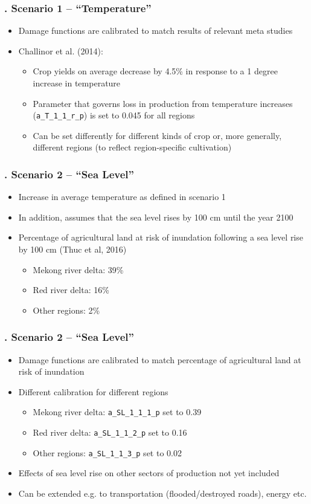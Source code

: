\documentclass[11pt,aspectratio=169]{beamer}
\begin{document}
\begin{frame}
\frametitle{{\thesection.\thesubsection} Scenario 1 -- "`Temperature"'}
\begin{itemize}
\item Damage functions are calibrated to match results of relevant meta studies
\item Challinor et al. (2014):
	\begin{itemize}
		\item Crop yields on average decrease by 4.5\% in response to a 1 degree increase in temperature
		\item Parameter that governs loss in production from temperature increases (\texttt{a\_T\_1\_1\_r\_p}) is set to 0.045 for all regions
		\item Can be set differently for different kinds of crop or, more generally, different regions (to reflect region-specific cultivation)
	\end{itemize}
\end{itemize}
\end{frame}

\begin{frame}
\frametitle{{\thesection.\thesubsection} Scenario 2 -- "`Sea Level"'}
\begin{itemize}
\item Increase in average temperature as defined in scenario 1
\item In addition, assumes that the sea level rises by 100 cm until the year 2100 
\item Percentage of agricultural land at risk of inundation following a sea level rise by 100 cm (Thuc et al, 2016)
	\begin{itemize}
		\item Mekong river delta: 39\%
		\item Red river delta: 16\%
		\item Other regions: 2\%
	\end{itemize}
\end{itemize}
\end{frame}

\begin{frame}
\frametitle{{\thesection.\thesubsection} Scenario 2 -- "`Sea Level"'}
\begin{itemize}
\item Damage functions are calibrated to match percentage of agricultural land at risk of inundation
\item Different calibration for different regions
	\begin{itemize}
		\item Mekong river delta: \texttt{a\_SL\_1\_1\_1\_p} set to 0.39
		\item Red river delta: \texttt{a\_SL\_1\_1\_2\_p} set to 0.16
		\item Other regions: \texttt{a\_SL\_1\_1\_3\_p} set to 0.02
	\end{itemize}
	\item Effects of sea level rise on other sectors of production not yet included
	\item Can be extended e.g. to transportation (flooded/destroyed roads), energy etc.
\end{itemize}
\end{frame}
\end{document}
